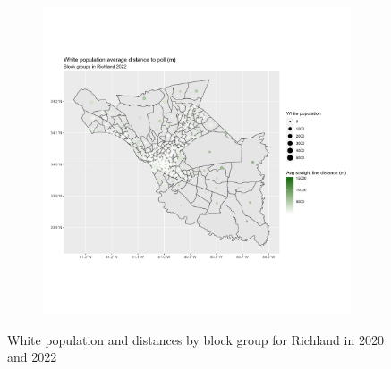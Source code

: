\documentclass[11pt]{article}
\theoremstyle{remark}
\theoremstyle{definition}
\begin{document}
\begin{figure}
\begin{subfigure}{.5\textwidth}
		\includegraphics[width=\linewidth]{result analysis/Richland_SC_original_configs/white_pop_and_dist_Richland_config_original_2022_polls.png}
		\label{sfig:Richland_2022_bg_dist}
	\end{subfigure}
	\caption{White population and distances by block group for Richland in 2020 and 2022}
	\label{fig:Richland distance White population maps}
\end{figure}
\end{document}

